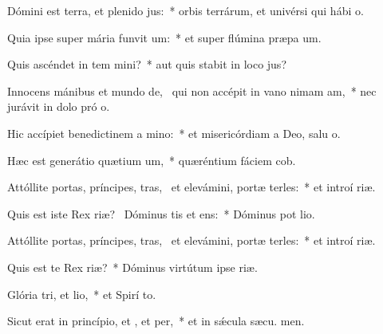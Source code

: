 \item Dómini est terra, et plenido jus:~* orbis terrárum, et univérsi qui hábi  o.
\item Quia ipse super mária funvit um:~* et super flúmina præpa um.
\item Quis ascéndet in tem mini?~* aut quis stabit in loco  jus?
\item Innocens mánibus et mundo de,~\pscross{} qui non accépit in vano nimam am,~* nec jurávit in dolo pró o.
\item Hic accípiet benedictinem a mino:~* et misericórdiam a Deo, salu o.
\item Hæc est generátio quætium um,~* quæréntium fáciem  cob.
\item Attóllite portas, príncipes, tras,~\pscross{} et elevámini, portæ terles:~* et introí  riæ.
\item Quis est iste Rex riæ?~\pscross{} Dóminus tis et ens:~* Dóminus pot  lio.
\item Attóllite portas, príncipes, tras,~\pscross{} et elevámini, portæ terles:~* et introí  riæ.
\item Quis est te Rex riæ?~* Dóminus virtútum ipse   riæ.
\item Glória tri, et lio,~* et Spirí to.
\item Sicut erat in princípio, et , et per,~* et in sǽcula sæcu. men.

